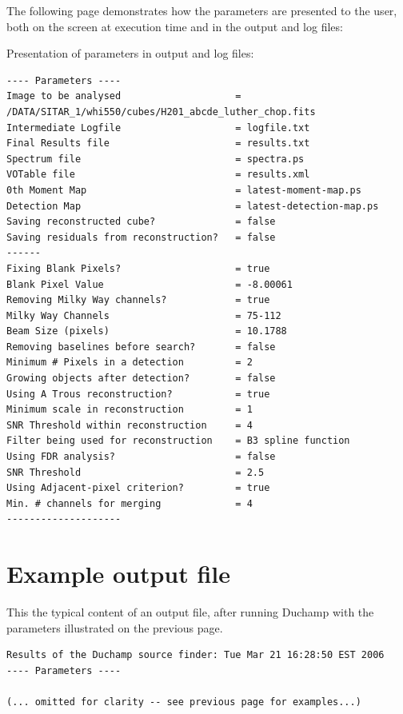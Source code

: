 \documentclass[12pt,a4paper]{article}
\begin{document}
The following page demonstrates how the parameters are presented to
the user, both on the screen at execution time and in the output and
log files:
\newpage
\begin{landscape}
Presentation of parameters in output and log files:  
\begin{verbatim}
---- Parameters ----
Image to be analysed                    = /DATA/SITAR_1/whi550/cubes/H201_abcde_luther_chop.fits
Intermediate Logfile                    = logfile.txt
Final Results file                      = results.txt
Spectrum file                           = spectra.ps
VOTable file                            = results.xml
0th Moment Map                          = latest-moment-map.ps
Detection Map                           = latest-detection-map.ps
Saving reconstructed cube?              = false
Saving residuals from reconstruction?   = false
------
Fixing Blank Pixels?                    = true
Blank Pixel Value                       = -8.00061
Removing Milky Way channels?            = true
Milky Way Channels                      = 75-112
Beam Size (pixels)                      = 10.1788
Removing baselines before search?       = false
Minimum # Pixels in a detection         = 2
Growing objects after detection?        = false
Using A Trous reconstruction?           = true
Minimum scale in reconstruction         = 1
SNR Threshold within reconstruction     = 4
Filter being used for reconstruction    = B3 spline function
Using FDR analysis?                     = false
SNR Threshold                           = 2.5
Using Adjacent-pixel criterion?         = true
Min. # channels for merging             = 4
--------------------
\end{verbatim}

\newpage
\section{Example output file}
\label{app-output}
This the typical content of an output file, after running Duchamp
with the parameters illustrated on the previous page. 

{\scriptsize 
  \begin{verbatim}
Results of the Duchamp source finder: Tue Mar 21 16:28:50 EST 2006
---- Parameters ----

(... omitted for clarity -- see previous page for examples...)


\end{verbatim}}
\end{landscape}
\end{document}
